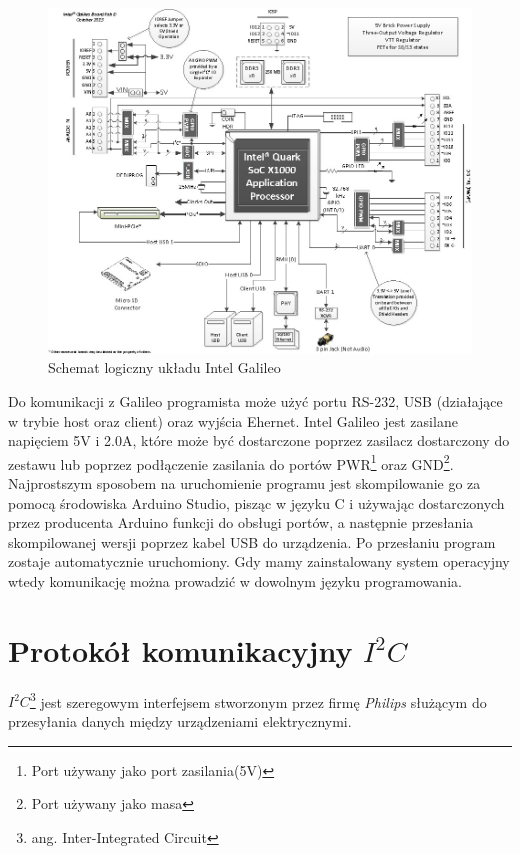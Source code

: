 \documentclass{xmgr}
\begin{document}
\begin{figure}[!h]
    \centering
    \includegraphics[height=0.8\textwidth]{images/IntelGalileoLogicSchematics.jpg}
    \caption{Schemat logiczny układu Intel Galileo\label{IntelGalileoLogicSchematics}}
\end{figure}

Do komunikacji z Galileo programista może użyć portu RS-232, USB (działające w trybie host oraz client) oraz wyjścia Ehernet. Intel Galileo jest zasilane napięciem 5V i 2.0A, które może być dostarczone poprzez zasilacz dostarczony do zestawu lub poprzez podłączenie zasilania do portów PWR\footnote{Port używany jako port zasilania(5V)} oraz GND\footnote{Port używany jako masa}. Najprostszym sposobem na uruchomienie programu jest skompilowanie go za pomocą środowiska Arduino Studio, pisząc w języku C i używając dostarczonych przez producenta Arduino funkcji do obsługi portów, a następnie przesłania skompilowanej wersji poprzez kabel USB do urządzenia. Po przesłaniu program zostaje automatycznie uruchomiony. Gdy mamy zainstalowany system operacyjny wtedy komunikację można prowadzić w dowolnym języku programowania.

\section{Protokół komunikacyjny $I^2C$}
\emph{$I^2C$}\footnote{ang. Inter-Integrated Circuit} jest szeregowym interfejsem stworzonym przez firmę \emph{Philips} służącym do przesyłania danych między urządzeniami elektrycznymi. 
\end{document}
